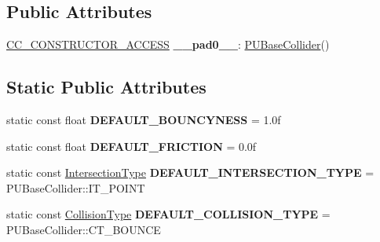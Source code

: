 \subsection*{Public Attributes}
\begin{DoxyCompactItemize}
\item 
\mbox{\label{classPUBaseCollider_a829b140475e95b62a61eed330f7b84d6}} 
\hyperlink{_2cocos2d_2cocos_2base_2ccConfig_8h_a25ef1314f97c35a2ed3d029b0ead6da0}{C\+C\+\_\+\+C\+O\+N\+S\+T\+R\+U\+C\+T\+O\+R\+\_\+\+A\+C\+C\+E\+SS} {\bfseries \+\_\+\+\_\+pad0\+\_\+\+\_\+}\+: \hyperlink{classPUBaseCollider}{P\+U\+Base\+Collider}()
\end{DoxyCompactItemize}
\subsection*{Static Public Attributes}
\begin{DoxyCompactItemize}
\item 
\mbox{\label{classPUBaseCollider_a771c03ffcdecdf4199ff484a99709a0a}} 
static const float {\bfseries D\+E\+F\+A\+U\+L\+T\+\_\+\+B\+O\+U\+N\+C\+Y\+N\+E\+SS} = 1.\+0f
\item 
\mbox{\label{classPUBaseCollider_a4cab5fd5e1e5634f49f942784c7a6348}} 
static const float {\bfseries D\+E\+F\+A\+U\+L\+T\+\_\+\+F\+R\+I\+C\+T\+I\+ON} = 0.\+0f
\item 
\mbox{\label{classPUBaseCollider_a8e590684e0c184523b8331b9237125ca}} 
static const \hyperlink{classPUBaseCollider_ae86fc81f78c00a88e8e927377a86e81c}{Intersection\+Type} {\bfseries D\+E\+F\+A\+U\+L\+T\+\_\+\+I\+N\+T\+E\+R\+S\+E\+C\+T\+I\+O\+N\+\_\+\+T\+Y\+PE} = P\+U\+Base\+Collider\+::\+I\+T\+\_\+\+P\+O\+I\+NT
\item 
\mbox{\label{classPUBaseCollider_a5b1699d88f23c9f6303cda9edbdd647a}} 
static const \hyperlink{classPUBaseCollider_a13f646d7a12d1abb3cca3043c817e726}{Collision\+Type} {\bfseries D\+E\+F\+A\+U\+L\+T\+\_\+\+C\+O\+L\+L\+I\+S\+I\+O\+N\+\_\+\+T\+Y\+PE} = P\+U\+Base\+Collider\+::\+C\+T\+\_\+\+B\+O\+U\+N\+CE
\end{DoxyCompactItemize}

